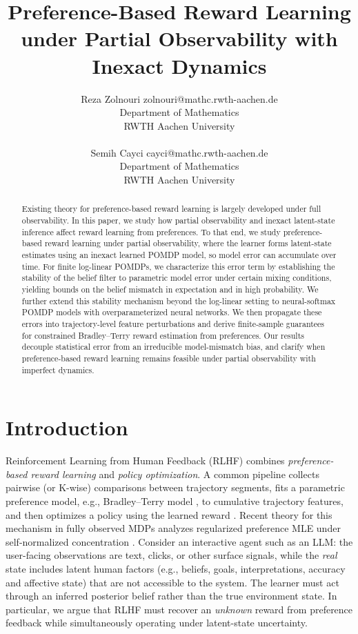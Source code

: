 \documentclass[10pt]{article} %
\title{Preference-Based Reward Learning under Partial Observability with Inexact Dynamics}
\author{\name Reza Zolnouri \email zolnouri@mathc.rwth-aachen.de \\
      \addr Department of Mathematics\\
      RWTH Aachen University
      \\
      \medskip
      \\
      \name Semih Cayci \email cayci@mathc.rwth-aachen.de \\
      \addr Department of Mathematics \\
      RWTH Aachen University}
\theoremstyle{plain}
\theoremstyle{definition}
\theoremstyle{remark}
\begin{document}
\maketitle

\begin{abstract}
Existing theory for preference-based reward learning is largely developed under full observability. In this paper, we study how partial observability and inexact latent-state inference affect reward learning from preferences. To that end, we study preference-based reward learning under partial observability, where the learner forms latent-state estimates using an inexact learned POMDP model, so model error can accumulate over time. For finite log-linear POMDPs, we characterize this error term by establishing the stability of the belief filter to parametric model error under certain mixing conditions, yielding bounds on the belief mismatch in expectation and in high probability. We further extend this stability mechanism beyond the log-linear setting to neural-softmax POMDP models with overparameterized neural networks. We then propagate these errors into trajectory-level feature perturbations and derive finite-sample guarantees for constrained Bradley--Terry reward estimation from preferences.
Our results decouple statistical error from an irreducible model-mismatch bias, and clarify when preference-based reward learning remains feasible under partial observability with imperfect dynamics.
\end{abstract}





\section{Introduction}
\label{sec:introduction}
 
Reinforcement Learning from Human Feedback (RLHF) combines \emph{preference-based reward learning} and \emph{policy optimization}. A common pipeline collects pairwise (or K-wise) comparisons between trajectory segments, fits a parametric preference model, e.g., Bradley--Terry model \citep{Bradley1952}, to cumulative trajectory features, and then optimizes a policy using the learned reward \citep{ChristianoLBMLA17, Wirth2017, kaufmann2025a}. Recent theory for this mechanism in fully observed MDPs analyzes regularized preference MLE under self-normalized concentration \citep{ZhuPrincipledComparisons, Du2024Exploration-DrivenUtilization}. Consider an interactive agent such as an LLM: the user-facing observations are text, clicks, or other surface signals, while the \emph{real} state includes latent human factors (e.g., beliefs, goals, interpretations, accuracy and affective state) that are not accessible to the system. The learner must act through an inferred posterior belief rather than the true environment state. In particular, we argue that RLHF must recover an \emph{unknown} reward from preference feedback while simultaneously operating under latent-state uncertainty.
\end{document}
